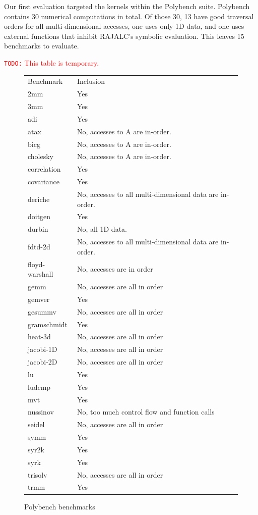 \documentclass[sigconf, table]{acmart}
\newcommand{\todo}[1]{{\textcolor{red}{{\tt{TODO:}}\,\,#1 }}}
\begin{document}
Our first evaluation targeted the kernels within the Polybench suite. 
Polybench contains 30 numerical computations in total. 
Of those 30, 13 have good traversal orders for all multi-dimensional accesses, one uses only 1D data, and one uses external functions that inhibit RAJALC's symbolic evaluation.
This leaves 15 benchmarks to evaluate.


\todo{This table is temporary.}
\begin{figure}
\begin{tabular}{ll}
Benchmark   & Inclusion \\
2mm         & Yes          \\
3mm         & Yes          \\
adi         & Yes          \\
atax        & No, accesses to A are in-order.          \\
bicg        & No, accesses to A are in-order.          \\
cholesky    & No, accesses to A are in-order.          \\
correlation & Yes          \\
covariance  & Yes          \\
deriche     & No, accesses to all multi-dimensional data are in-order.          \\
doitgen     & Yes          \\
durbin      & No, all 1D data.          \\
fdtd-2d     & No, accesses to all multi-dimensional data are in-order.           \\
floyd-warshall & No, accesses are in order \\
gemm        &  No, accesses are all in order         \\
gemver      & Yes          \\
gesummv     & No, accesses are all in order          \\
gramschmidt & Yes          \\
heat-3d     & No, accesses are all in order            \\
jacobi-1D   & No, accesses are all in order           \\
jacobi-2D   & No, accesses are all in order           \\
lu          & Yes         \\
ludcmp      & Yes          \\
mvt         & Yes          \\
nussinov    & No, too much control flow and function calls          \\
seidel      & No, accesses are all in order           \\
symm        & Yes          \\
syr2k       & Yes          \\
syrk        & Yes          \\
trisolv     & No, accesses are all in order           \\
trmm        & Yes         
\end{tabular}
\caption{Polybench benchmarks}
\end{figure}
\end{document}
